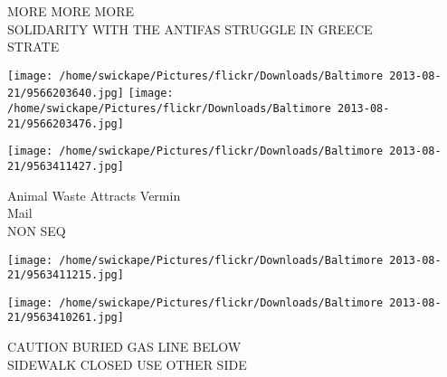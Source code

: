 \documentclass[10pt,letterpaper]{article}
\begin{document}
MORE MORE MORE\\
SOLIDARITY WITH THE ANTIFAS STRUGGLE IN GREECE\\
STRATE\\
\pagebreak

\texttt{[image: /home/swickape/Pictures/flickr/Downloads/Baltimore 2013-08-21/9566203640.jpg]}
\texttt{[image: /home/swickape/Pictures/flickr/Downloads/Baltimore 2013-08-21/9566203476.jpg]}

\texttt{[image: /home/swickape/Pictures/flickr/Downloads/Baltimore 2013-08-21/9563411427.jpg]}

Animal Waste Attracts Vermin\\
Mail\\
NON SEQ\\
\pagebreak

\texttt{[image: /home/swickape/Pictures/flickr/Downloads/Baltimore 2013-08-21/9563411215.jpg]}

\vspace{0.25in}
\texttt{[image: /home/swickape/Pictures/flickr/Downloads/Baltimore 2013-08-21/9563410261.jpg]}

CAUTION BURIED GAS LINE BELOW\\
SIDEWALK CLOSED USE OTHER SIDE\\
\pagebreak
\end{document}
